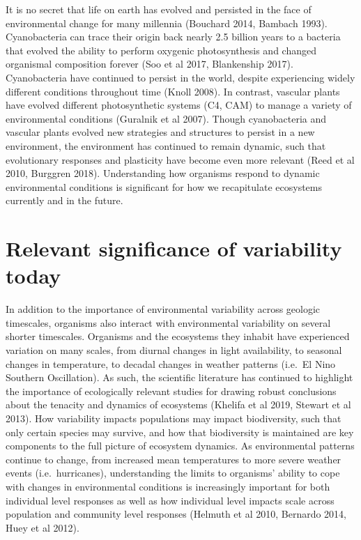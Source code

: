 \documentclass[12pt,twoside]{reedthesis}
\begin{document}
It is no secret that life on earth has evolved and persisted in the face of environmental change for many millennia (Bouchard 2014, Bambach 1993). Cyanobacteria can trace their origin back nearly 2.5 billion years to a bacteria that evolved the ability to perform oxygenic photosynthesis and changed organismal composition forever (Soo et al 2017, Blankenship 2017). Cyanobacteria have continued to persist in the world, despite experiencing widely different conditions throughout time (Knoll 2008). In contrast, vascular plants have evolved different photosynthetic systems (C4, CAM) to manage a variety of environmental conditions (Guralnik et al 2007). Though cyanobacteria and vascular plants evolved new strategies and structures to persist in a new environment, the environment has continued to remain dynamic, such that evolutionary responses and plasticity have become even more relevant (Reed et al 2010, Burggren 2018). Understanding how organisms respond to dynamic environmental conditions is significant for how we recapitulate ecosystems currently and in the future.

\hypertarget{relevant-significance-of-variability-today}{%
\section{Relevant significance of variability today}\label{relevant-significance-of-variability-today}}

In addition to the importance of environmental variability across geologic timescales, organisms also interact with environmental variability on several shorter timescales. Organisms and the ecosystems they inhabit have experienced variation on many scales, from diurnal changes in light availability, to seasonal changes in temperature, to decadal changes in weather patterns (i.e.~El Nino Southern Oscillation). As such, the scientific literature has continued to highlight the importance of ecologically relevant studies for drawing robust conclusions about the tenacity and dynamics of ecosystems (Khelifa et al 2019, Stewart et al 2013). How variability impacts populations may impact biodiversity, such that only certain species may survive, and how that biodiversity is maintained are key components to the full picture of ecosystem dynamics. As environmental patterns continue to change, from increased mean temperatures to more severe weather events (i.e.~hurricanes), understanding the limits to organisms' ability to cope with changes in environmental conditions is increasingly important for both individual level responses as well as how individual level impacts scale across population and community level responses (Helmuth et al 2010, Bernardo 2014, Huey et al 2012).
\end{document}
